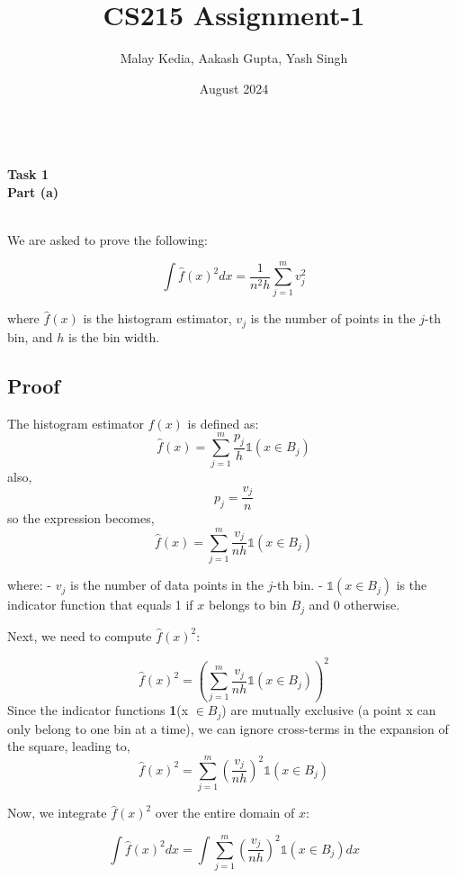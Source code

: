 \documentclass[a4paper,12pt,answers]{exam}
\title{CS215 Assignment-1}
\author{Malay Kedia, Aakash Gupta, Yash Singh}
\date{August 2024}
\begin{document}
\maketitle
\begin{questions}
\\
  
\textbf{Task 1}\\
\textbf{Part (a)}
\begin{solution}\\

We are asked to prove the following:

\[
\int \hat{f}(x)^2 dx = \frac{1}{n^2 h} \sum_{j=1}^{m} v_j^2
\]

where \( \hat{f}(x) \) is the histogram estimator, \( v_j \) is the number of points in the \( j \)-th bin, and \( h \) is the bin width.

\subsection*{Proof}

The histogram estimator \( \hat{f}(x) \) is defined as:
\[
\hat{f}(x) = \sum_{j=1}^{m} \frac{p_j}{h} \mathds{1}(x \in B_j)
\]
also, \[ p_j = \frac{v_j}{n}\]
so the expression becomes,
\[
\hat{f}(x) = \sum_{j=1}^{m} \frac{v_j}{nh} \mathds{1}(x \in B_j)
\]

where:
- \( v_j \) is the number of data points in the \( j \)-th bin.
- \( \mathds{1}(x \in B_j) \) is the indicator function that equals 1 if \( x \) belongs to bin \( B_j \) and 0 otherwise.


Next, we need to compute \( \hat{f}(x)^2 \):

\[
\hat{f}(x)^2 = \left( \sum_{j=1}^{m} \frac{v_j}{nh} \mathds{1}(x \in B_j) \right)^2
\]
Since the indicator functions \textbf{1}(x $\in B_j$)  are mutually exclusive (a point x can only belong to one bin at a time), we can ignore cross-terms in the expansion of the square, leading to,
\[
\hat{f}(x)^2 = \sum_{j=1}^{m} \left( \frac{v_j}{nh} \right)^2 \mathds{1}(x \in B_j)
\]

Now, we integrate \( \hat{f}(x)^2 \) over the entire domain of \( x \):

\[
\int \hat{f}(x)^2 dx = \int \sum_{j=1}^{m} \left( \frac{v_j}{nh} \right)^2 \mathds{1}(x \in B_j) dx
\]


\end{solution}
\end{questions}
\end{document}
